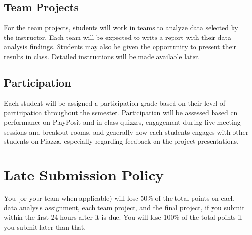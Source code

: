 \documentclass[11pt, a4paper]{article}
\begin{document}
\subsection{Team Projects}
For the team projects, students will work in teams to analyze data selected by the instructor. Each team will be expected to write a report with their data analysis findings. Students may also be given the opportunity to present their results in class. Detailed instructions will be made available later.

\subsection{Participation}
Each student will be assigned a participation grade based on their level of participation throughout the semester. Participation will be assessed based on performance on  PlayPosit and in-class quizzes, engagement during live meeting sessions and breakout rooms, and generally how each students engages with other students on Piazza, especially regarding feedback on the project presentations.


\section{Late Submission Policy} 
You (or your team when applicable) will lose 50\% of the total points on each data analysis assignment, each team project, and the final project, if you submit within the first 24 hours after it is due. You will lose 100\% of the total points if you submit later than that.
\end{document}
